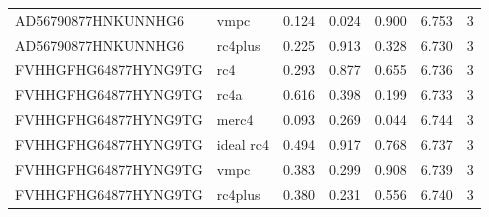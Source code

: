 \begin{longtable}{llrrrrr}
AD56790877HNKUNNHG6 & vmpc & 0.124 & 0.024 & 0.900 & 6.753 & 3 \\
AD56790877HNKUNNHG6 & rc4plus & 0.225 & 0.913 & 0.328 & 6.730 & 3 \\
FVHHGFHG64877HYNG9TG & rc4 & 0.293 & 0.877 & 0.655 & 6.736 & 3 \\
FVHHGFHG64877HYNG9TG & rc4a & 0.616 & 0.398 & 0.199 & 6.733 & 3 \\
FVHHGFHG64877HYNG9TG & merc4 & 0.093 & 0.269 & 0.044 & 6.744 & 3 \\
FVHHGFHG64877HYNG9TG & ideal rc4 & 0.494 & 0.917 & 0.768 & 6.737 & 3 \\
FVHHGFHG64877HYNG9TG & vmpc & 0.383 & 0.299 & 0.908 & 6.739 & 3 \\
FVHHGFHG64877HYNG9TG & rc4plus & 0.380 & 0.231 & 0.556 & 6.740 & 3 \\
\end{longtable}
